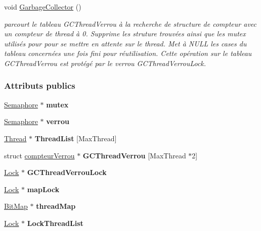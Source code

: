 \begin{DoxyCompactItemize}
\hypertarget{class_addr_space_a02fcf9f9829c38a69e847681fef503ab}{}\label{class_addr_space_a02fcf9f9829c38a69e847681fef503ab} 
void \hyperlink{class_addr_space_a02fcf9f9829c38a69e847681fef503ab}{Garbage\+Collector} ()
\begin{DoxyCompactList}\small\item\em parcourt le tableau G\+C\+Thread\+Verrou à la recherche de structure de compteur avec un compteur de thread à 0. Supprime les struture trouvées ainsi que les mutex utilisés pour pour se mettre en attente sur le thread. Met à N\+U\+LL les cases du tableau concernées une fois fini pour réutilisation. Cette opération sur le tableau G\+C\+Thread\+Verrou est protégé par le verrou G\+C\+Thread\+Verrou\+Lock. \end{DoxyCompactList}\end{DoxyCompactItemize}
\subsubsection*{Attributs publics}
\begin{DoxyCompactItemize}
\item 
\hypertarget{class_addr_space_a1ee45c0f68ff24be2e0c5a301f6e7c77}{}\label{class_addr_space_a1ee45c0f68ff24be2e0c5a301f6e7c77} 
\hyperlink{class_semaphore}{Semaphore} $\ast$ {\bfseries mutex}
\item 
\hypertarget{class_addr_space_aa42f86e2f783f75b4f7696ed6569f799}{}\label{class_addr_space_aa42f86e2f783f75b4f7696ed6569f799} 
\hyperlink{class_semaphore}{Semaphore} $\ast$ {\bfseries verrou}
\item 
\hypertarget{class_addr_space_afce98e903a4e4e57d7cdfc83a59259a6}{}\label{class_addr_space_afce98e903a4e4e57d7cdfc83a59259a6} 
\hyperlink{class_thread}{Thread} $\ast$ {\bfseries Thread\+List} \mbox{[}Max\+Thread\mbox{]}
\item 
\hypertarget{class_addr_space_a85a4f4cf62f078fcb6b52e62e11f994c}{}\label{class_addr_space_a85a4f4cf62f078fcb6b52e62e11f994c} 
struct \hyperlink{structcompteur_verrou}{compteur\+Verrou} $\ast$ {\bfseries G\+C\+Thread\+Verrou} \mbox{[}Max\+Thread $\ast$2\mbox{]}
\item 
\hypertarget{class_addr_space_adbf243386d0eb95c95f089e733d88b91}{}\label{class_addr_space_adbf243386d0eb95c95f089e733d88b91} 
\hyperlink{class_lock}{Lock} $\ast$ {\bfseries G\+C\+Thread\+Verrou\+Lock}
\item 
\hypertarget{class_addr_space_a7f329a364d07cd9bbd276e113bc9fa76}{}\label{class_addr_space_a7f329a364d07cd9bbd276e113bc9fa76} 
\hyperlink{class_lock}{Lock} $\ast$ {\bfseries map\+Lock}
\item 
\hypertarget{class_addr_space_ab1fd4a7fd8d2b4fd9d9cb3a73cc521cb}{}\label{class_addr_space_ab1fd4a7fd8d2b4fd9d9cb3a73cc521cb} 
\hyperlink{class_bit_map}{Bit\+Map} $\ast$ {\bfseries thread\+Map}
\item 
\hypertarget{class_addr_space_a9628f37e9a94c976a35cc5dd75f41e38}{}\label{class_addr_space_a9628f37e9a94c976a35cc5dd75f41e38} 
\hyperlink{class_lock}{Lock} $\ast$ {\bfseries Lock\+Thread\+List}
\end{DoxyCompactItemize}
